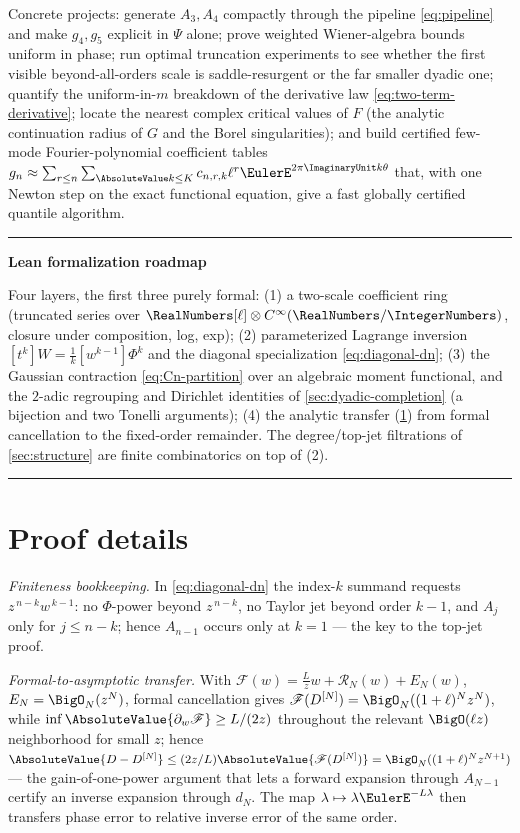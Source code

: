 \documentclass[11pt,oneside]{article}
\numberwithin{equation}{section}
\theoremstyle{definition}
\theoremstyle{remark}
\newenvironment{statusbox}[1]{%
  \par\smallskip\noindent\begin{center}\begin{minipage}{0.94\textwidth}%
  \hrule\vspace{0.5em}\noindent\textbf{#1}\par\smallskip
}{%
  \vspace{0.5em}\hrule\end{minipage}\end{center}\smallskip
}
\begin{document}
Concrete projects: generate $A_3,A_4$ compactly through the pipeline
\eqref{eq:pipeline} and make $g_4,g_5$ explicit in $\Psi$ alone;
prove weighted Wiener-algebra bounds uniform in phase; run optimal
truncation experiments to see whether the first visible
beyond-all-orders scale is saddle-resurgent or the far smaller
dyadic one; quantify the uniform-in-$m$ breakdown of the derivative
law \eqref{eq:two-term-derivative}; locate the nearest complex
critical values of $F$ (the analytic continuation radius of $G$ and
the Borel singularities); and build certified few-mode
Fourier-polynomial coefficient tables
$g_n\approx\sum_{r\le n}\sum_{\AbsoluteValue k\le K}c_{n,r,k}\ell^{r}
\EulerE^{2\pi\ImaginaryUnit k\theta}$ that, with one Newton step on the exact
functional equation, give a fast globally certified quantile
algorithm.

\begin{statusbox}{Lean formalization roadmap}
Four layers, the first three purely formal:
(1) a two-scale coefficient ring (truncated series over
$\RealNumbers[\ell]\otimes C^\infty(\RealNumbers/\IntegerNumbers)$, closure under composition, log,
exp); (2) parameterized Lagrange inversion
$[t^{k}]W=\tfrac1k[w^{k-1}]\Phi^{k}$ and the diagonal specialization
\eqref{eq:diagonal-dn}; (3) the Gaussian contraction
\eqref{eq:Cn-partition} over an algebraic moment functional, and the
$2$-adic regrouping and Dirichlet identities of
\cref{sec:dyadic-completion} (a bijection and two Tonelli
arguments); (4) the analytic transfer
(\cref{app:proof-details}) from formal cancellation to the
fixed-order remainder.  The degree/top-jet filtrations of
\cref{sec:structure} are finite combinatorics on top of (2).
\end{statusbox}

\appendix

\section{Proof details}
\label{app:proof-details}

\emph{Finiteness bookkeeping.}  In \eqref{eq:diagonal-dn} the index-$k$
summand requests $z^{\,n-k}w^{\,k-1}$: no $\Phi$-power beyond
$z^{\,n-k}$, no Taylor jet beyond order $k-1$, and $A_j$ only for
$j\le n-k$; hence $A_{n-1}$ occurs only at $k=1$ --- the key to the
top-jet proof.

\emph{Formal-to-asymptotic transfer.}  With
$\mathscr F(w)=\tfrac Lzw+\mathcal R_N(w)+E_N(w)$,
$E_N=\BigO_N(z^{N})$, formal cancellation gives
$\mathscr F(D^{[N]})=\BigO_N((1+\ell)^{N}z^{N})$, while
$\inf\AbsoluteValue{\partial_w\mathscr F}\ge L/(2z)$ throughout the relevant
$\BigO(\ell z)$ neighborhood for small $z$; hence
$\AbsoluteValue{D-D^{[N]}}\le(2z/L)\AbsoluteValue{\mathscr F(D^{[N]})}
=\BigO_N((1+\ell)^{N}z^{N+1})$ --- the gain-of-one-power argument
that lets a forward expansion through $A_{N-1}$ certify an inverse
expansion through $d_N$.  The map
$\lambda\mapsto\lambda\EulerE^{-L\lambda}$ then transfers phase error to
relative inverse error of the same order.
\end{document}
